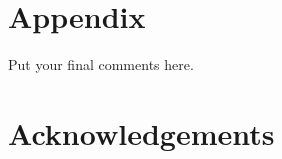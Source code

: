 \documentclass[useAMS,referee]{biom}
\begin{document}
\section{Appendix}

Put your final comments here. 


\backmatter


\section*{Acknowledgements}






%
%   
% 




\label{lastpage}
\end{document}
